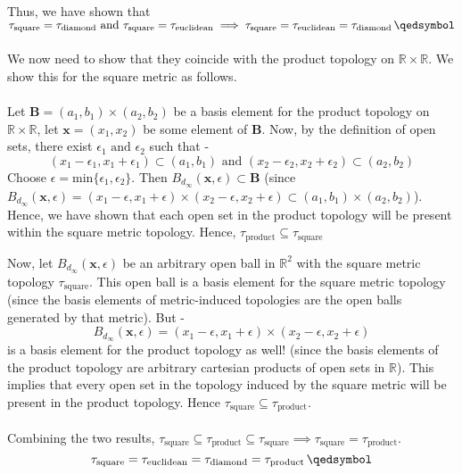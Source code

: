 \begin{frame}
    Thus, we have shown that $\tau_{\text{square}} = \tau_{\text{diamond}} \text{ and } \tau_{\text{square}} = \tau_{\text{euclidean}} \implies \tau_{\text{square}} = \tau_{\text{euclidean}} = \tau_{\text{diamond}} \, \qedsymbol$ \\\\
    \pause
    We now need to show that they coincide with the product topology on $\mathbb{R} \times \mathbb{R}$. We show this for the square metric as follows. \\\\
    \pause
    Let $\boldsymbol{B} = (a_1,b_1) \times (a_2,b_2)$ be a basis element for the product topology on $\mathbb{R} \times \mathbb{R}$, let $\boldsymbol{x} = (x_1, x_2)$ be some element of $\boldsymbol{B}$. Now, by the definition of open sets, there exist $\epsilon_1 \text{ and } \epsilon_2$ such that -
    \begin{equation*}
        (x_1 - \epsilon_1,x_1 + \epsilon_1) \subset (a_1,b_1) \text{ and }(x_2 - \epsilon_2,x_2 + \epsilon_2) \subset (a_2,b_2)
    \end{equation*}
    \pause
    Choose $\epsilon = \text{min} \{\epsilon_1, \epsilon_2\}$. Then $B_{d_\infty}(\boldsymbol{x},\epsilon) \subset \boldsymbol{B}$ (since $B_{d_\infty}(\boldsymbol{x},\epsilon) = (x_1 - \epsilon,x_1 + \epsilon) \times (x_2 - \epsilon,x_2 + \epsilon)\subset (a_1,b_1) \times (a_2,b_2)$).\\
    \pause
    Hence, we have shown that each open set in the product topology will be present within the square metric topology. Hence, $\tau_{\text{product}} \subseteq \tau_{\text{square}}$
\end{frame}

\begin{frame}
    Now, let $B_{d_{\infty}}(\boldsymbol{x},\epsilon)$ be an arbitrary open ball in $\mathbb{R}^2$ with the square metric topology $\tau_{\text{square}}$. This open ball is a basis element for the square metric topology (since the basis elements of metric-induced topologies are the open balls generated by that metric). But -
    \begin{equation*}
        B_{d_{\infty}}(\boldsymbol{x},\epsilon) = (x_1 - \epsilon, x_1 + \epsilon) \times (x_2 - \epsilon, x_2 + \epsilon)
    \end{equation*}
    \pause
    is a basis element for the product topology as well! (since the basis elements of the product topology are arbitrary cartesian products of open sets in $\mathbb{R}$). This implies that every open set in the topology induced by the square metric will be present in the product topology. Hence $\tau_{\text{square}} \subseteq \tau_{\text{product}}$.\\\\
    \pause
    Combining the two results, $\tau_{\text{square}} \subseteq \tau_{\text{product}} \subseteq \tau_{\text{square}} \implies \tau_{\text{square}} = \tau_{\text{product}}$.
    \begin{equation*}
        \tau_{\text{square}} = \tau_{\text{euclidean}} = \tau_{\text{diamond}} = \tau_{\text{product}} \, \qedsymbol
    \end{equation*}
\end{frame}